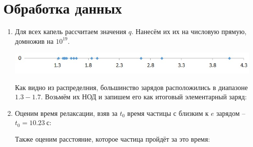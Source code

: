 \documentclass[a4paper,12pt]{article} %
\begin{document}
\section*{Обработка данных}
\begin{enumerate}
\item Для всех капель рассчитаем значения $q$. Нанесём их их на числовую прямую, домножив на $10^{19}$.

\begin{center}
	\includegraphics[scale=0.6]{2.jpg}
\end{center}
Как видно из распределния, большинство зарядов расположились в диапазоне $1.3-1.7$. Возьмём их НОД и запишем его как итоговый элементарный заряд:
\begin{center}
\end{center}
\item Оценим время релаксации, взяв за $t_0$ время частицы с близким к $e$ зарядом -- $t_0 = 10.23~\text{с}$:
\begin{center}
\end{center}
Также оценим расстояние, которое частица пройдёт за это время:
\begin{center}
\end{center}
\end{enumerate}
\end{document}
